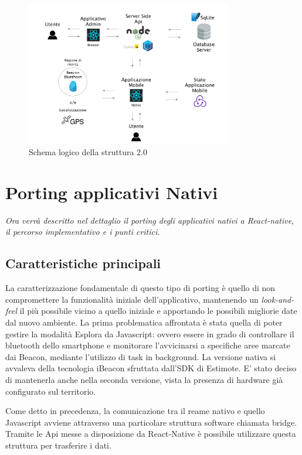 \begin{figure}[h]
\centering
\includegraphics[width=0.8\textwidth]{images/stackAlakai.png}
\caption{Schema logico della struttura 2.0}
\end{figure}


\section{Porting applicativi Nativi}\vspace{5mm}
\emph{Ora verrà descritto nel dettaglio il porting degli applicativi nativi a React-native, il percorso implementativo e i punti critici.}
\vspace{5mm}
\subsection{Caratteristiche principali}\vspace{5mm}

La caratterizzazione fondamentale di questo tipo di porting è quello di non compromettere la funzionalità iniziale dell’applicativo, mantenendo un \emph{look-and-feel} il più possibile vicino a quello iniziale e apportando le possibili migliorie date dal nuovo ambiente. La prima problematica affrontata è stata quella di poter gestire la modalità Esplora da Javascript: ovvero essere in grado di controllare il bluetooth dello smartphone e monitorare l’avvicinarsi a specifiche aree marcate dai Beacon, mediante l'utilizzo di task in background. La versione nativa si avvaleva della tecnologia iBeacon sfruttata dall'SDK di Estimote. E' stato deciso di mantenerla anche nella seconda versione, vista la presenza di hardware già configurato sul territorio.  \vspace{5mm}

Come detto in precedenza, la comunicazione tra il reame nativo e quello Javascript avviene attraverso una particolare struttura software chiamata bridge. Tramite le Api messe a disposizione da React-Native è possibile utilizzare questa struttura per trasferire i dati. \vspace{5mm}

